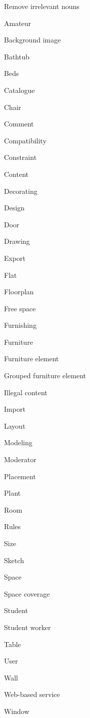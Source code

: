 \begin{paracol}{4}
			Remove irrelevant nouns\\
			\begin{compactitem}
				\item Amateur
				\item Background image
				\item Bathtub
				\item Beds
				\item Catalogue
				\item Chair
				\item Comment
				\item Compatibility
				\item Constraint
				\item Content
				\item Decorating
				\item Design
				\item Door
				\item Drawing
				\item Export
				\item Flat
				\item Floorplan
				\item Free space
				\item Furnishing
				\item Furniture
				\item Furniture element
				\item Grouped furniture element
				\item Illegal content
				\item Import
				\item Layout
				\item Modeling
				\item Moderator
				\item Placement
				\item Plant
				\item Room
				\item Rules
				\item Size
				\item Sketch
				\item Space
				\item Space coverage
				\item Student
				\item Student worker
				\item Table
				\item User
				\item Wall
				\item Web-based service
				\item Window
			\end{compactitem}
			

\end{paracol}
